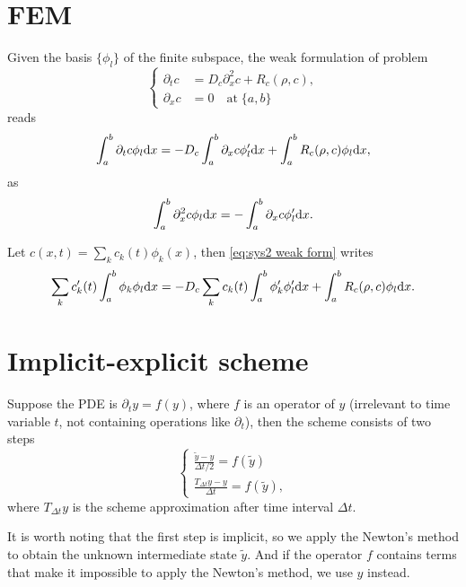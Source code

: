 \documentclass{article}
\begin{document}
  \section{FEM}
  Given the basis $\{\phi_l\}$ of the finite subspace, the weak formulation of problem
  \[
    \left\{
      \begin{aligned}
        \partial_t c &= D_c \partial_x^2 c + R_c(\rho, c), \\
        \partial_x c &= 0\quad\text{at}\;\{a,b\}
      \end{aligned}
    \right.
  \]
  reads
  \begin{equation}
    \label{eq:sys2 weak form}
    \int_a^b \partial_t c \phi_l\mathrm d x = - D_c\int_a^b \partial_x c\phi_l'\mathrm d x
                                          + \int_a^b R_c(\rho, c)\phi_l\mathrm d x,
  \end{equation}
  as
  \[
    \int_a^b \partial^2_x c\phi_l \mathrm d x = - \int_a^b \partial_x c\phi_l'\mathrm d x.
  \]

  Let $c(x, t) = \sum_k c_k(t)\phi_k(x)$, then \cref{eq:sys2 weak form} writes
  \[
    \sum_k c'_k(t)\int_a^b\phi_k\phi_l\mathrm d x = - D_c\sum_k c_k(t)\int_a^b\phi_k'\phi_l'\mathrm d x
                                                + \int_a^b R_c(\rho, c)\phi_l\mathrm d x.
  \]

  \section{Implicit-explicit scheme}
  Suppose the PDE is $\partial_t y = f(y)$, where $f$ is an operator of $y$ (irrelevant to time
  variable $t$, not containing operations like $\partial_t$), then the scheme consists of two steps
  \[
    \left\{
      \begin{aligned}
        \frac{\tilde y - y}{\Delta t / 2} = f(\tilde y)\\
        \frac{T_{\Delta t}y - y}{\Delta t} = f(\tilde y),
      \end{aligned}
    \right.
  \]
  where $T_{\Delta t}y$ is the scheme approximation after time interval $\Delta t$.

  It is worth noting that the first step is implicit, so we apply the Newton's method to obtain
  the unknown intermediate state $\tilde y$. And if the operator $f$ contains terms that make
  it impossible to apply the Newton's method, we use $y$ instead.
\end{document}
